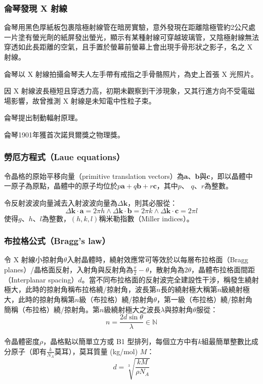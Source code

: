 \documentclass[a4paper,12pt]{article}
\begin{document}
\subsubsection{侖琴發現 X 射線}
\bit
\item 侖琴用黑色厚紙板包裹陰極射線管在暗房實驗，意外發現在距離陰極管約2公尺處一片塗有螢光劑的紙屏發出螢光，顯示有某種射線可穿越玻璃管，又陰極射線無法穿透如此長距離的空氣，且手置於螢幕前螢幕上會出現手骨形狀之影子，名之 X 射線。
\item 侖琴以 X 射線拍攝侖琴夫人左手帶有戒指之手骨骼照片，為史上首張 X 光照片。
\item 因 X 射線波長極短且穿透力高，初期未觀察到干涉現象，又其行進方向不受電磁場影響，故曾推測 X 射線是未知電中性粒子束。
\item 侖琴提出制動輻射原理。
\item 侖琴1901年獲首次諾貝爾獎之物理獎。
\eit
\subsubsection{勞厄方程式（Laue equations）}
令晶格的原始平移向量（primitive translation vectors）為$\mathbf {a}$、$\mathbf{b}$與$\mathbf {c}$，即以晶體中一原子為原點，晶體中的原子均位於$p\mathbf {a} +q\mathbf {b} +r\mathbf {c} $，其中$p$、 $q$、$r$為整數。

令反射波波向量減去入射波波向量為$\Delta\mathbf{k}$，則其必服從：
\[\Delta\mathbf{k}\cdot\mathbf{a}=2\pi h\land\Delta\mathbf{k}\cdot\mathbf{b}=2\pi k\land\Delta\mathbf{k}\cdot\mathbf{c}=2\pi l\]
使得$g$、$h$、$l$為整數，$(h,k,l)$稱米勒指數（Miller indices）。
\subsubsection{布拉格公式（Bragg's law）}
令 X 射線小掠射角$\theta$入射晶體時，繞射效應常可等效於以每層布拉格面（Bragg planes）/晶格面反射，入射角與反射角為$\frac{\pi}{2}-\theta$，散射角為$2\theta$，晶體布拉格面間距（Interplanar spacing）$d$。當不同布拉格面的反射波完全建設性干涉，稱發生繞射極大，此時的掠射角稱布拉格繞/掠射角，波長第$n$長的繞射極大稱第$n$級繞射極大，此時的掠射角稱第$n$級（布拉格）繞/掠射角$\theta$，第一級（布拉格）繞/掠射角簡稱（布拉格）繞/掠射角。第$n$級繞射極大之波長$\lambda$與掠射角$\theta$服從：
\[n=\frac{2d\sin\theta}{\lambda}\in\mathbb{N}\]

令晶體密度$\rho$，晶格點以簡單立方或 B1 型排列，每個立方中有$k$組最簡單整數比成分原子（即有$\frac{k}{N_A}$莫耳），莫耳質量 (kg/mol) $M$：
\[d=\sqrt[3]{\frac{kM}{\rho N_A}}\]
\end{document}
